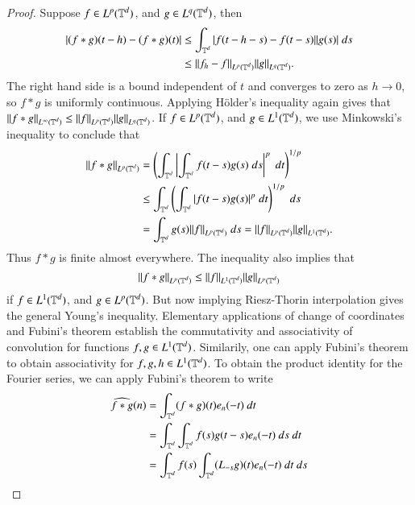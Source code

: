 \begin{proof}
    Suppose $f \in L^p(\operatorname{\mathbb{T}}^d)$, and $g \in L^q(\operatorname{\mathbb{T}}^d)$, then
    \begin{align*}
        |(f * g)(t - h) - (f * g)(t)| &\leq \int_{\operatorname{\mathbb{T}}^d} |f(t-h-s) - f(t-s)| |g(s)|\; ds\\
        &\leq \| f_h - f \|_{L^p(\operatorname{\mathbb{T}}^d)} \| g \|_{L^q(\operatorname{\mathbb{T}}^d)}.
    \end{align*}
    The right hand side is a bound independent of $t$ and converges to zero as $h \to 0$, so $f * g$ is uniformly continuous. Applying H\"{o}lder's inequality again gives that $\| f * g \|_{L^\infty(\operatorname{\mathbb{T}}^d)} \leq \| f \|_{L^p(\operatorname{\mathbb{T}}^d)} \| g \|_{L^q(\operatorname{\mathbb{T}}^d)}$. If $f \in L^p(\operatorname{\mathbb{T}}^d)$, and $g \in L^1(\operatorname{\mathbb{T}}^d)$, we use Minkowski's inequality to conclude that
    \begin{align*}
        \| f * g \|_{L^p(\operatorname{\mathbb{T}}^d)} &= \left( \int_{\operatorname{\mathbb{T}}^d} \left| \int_{\operatorname{\mathbb{T}}^d} f(t-s)g(s)\; ds \right|^p\; dt \right)^{1/p}\\
        &\leq \int_{\operatorname{\mathbb{T}}^d} \left( \int_{\operatorname{\mathbb{T}}^d} |f(t-s)g(s)|^p\; dt \right)^{1/p}\; ds\\
        &= \int_{\operatorname{\mathbb{T}}^d} g(s) \| f \|_{L^p(\operatorname{\mathbb{T}}^d)}\; ds = \| f \|_{L^p(\operatorname{\mathbb{T}}^d)} \| g \|_{L^1(\operatorname{\mathbb{T}}^d)}.
    \end{align*}
    Thus $f * g$ is finite almost everywhere. The inequality also implies that
    \[ \| f * g \|_{L^p(\operatorname{\mathbb{T}}^d)} \leq \| f \|_{L^1(\operatorname{\mathbb{T}}^d)} \| g \|_{L^p(\operatorname{\mathbb{T}}^d)} \]
    if $f \in L^1(\operatorname{\mathbb{T}}^d)$, and $g \in L^p(\operatorname{\mathbb{T}}^d)$. But now implying Riesz-Thorin interpolation gives the general Young's inequality. Elementary applications of change of coordinates and Fubini's theorem establish the commutativity and associativity of convolution for functions $f, g \in L^1(\operatorname{\mathbb{T}}^d)$.
    Similarily, one can apply Fubini's theorem to obtain associativity for $f,g,h \in L^1(\operatorname{\mathbb{T}}^d)$. To obtain the product identity for the Fourier series, we can apply Fubini's theorem to write
    \begin{align*}
        \widehat{f * g}(n) &= \int_{\TT^d} (f * g)(t) e_n(-t)\ dt\\
        &= \int_{\TT^d} \int_{\TT^d} f(s)g(t-s) e_n(-t)\ ds\ dt\\
        &= \int_{\TT^d} f(s) \int_{\TT^d} (L_{-s}g)(t) e_n(-t)\ dt\ ds\\

\end{align*}
\end{proof}
